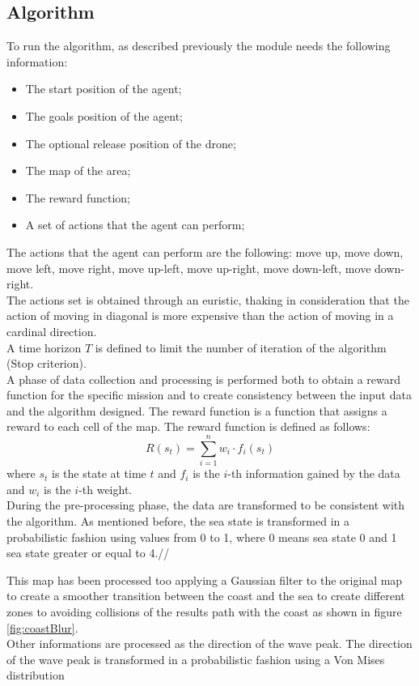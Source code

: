 \documentclass[journal,article,submit,pdftex,moreauthors]{Definitions/mdpi}
\begin{document}
\subsection{Algorithm}
To run the algorithm, as described previously the module needs the following information:
\begin{itemize}
	\item The start position of the agent;
	\item The goals position of the agent;
	\item The optional release position of the drone;
	\item The map of the area;
	\item The reward function;
	\item A set of actions that the agent can perform;
\end{itemize}

The actions that the agent can perform are the following: {move up, move down, move left, move right, move up-left, move up-right, move down-left, move down-right}.\\
The actions set is obtained through an euristic, thaking in consideration that the action of moving in diagonal is more expensive than the action of moving in a cardinal direction.\\
A time horizon $T$ is defined to limit the number of iteration of the algorithm (Stop criterion).\\

A phase of data collection and processing is performed both to obtain a reward function for the specific mission and to create consistency between the input data and the algorithm designed.
The reward function is a function that assigns a reward to each cell of the map. The reward function is defined as follows:
\begin{equation}
\label{eq:reward}
R(s_t) = \sum_{i=1}^n w_i \cdot f_i(s_t)
\end{equation}
where $s_t$ is the state at time $t$ and $f_i$ is the $i$-th information gained by the data and $w_i$ is the $i$-th weight.\\

During the pre-processing phase, the data are transformed to be consistent with the algorithm. As mentioned before, the sea state is transformed in a 
probabilistic fashion using values from 0 to 1, where 0 means sea state 0 and 1 sea state greater or equal to 4.//

This map has been processed too applying a Gaussian filter to the original map to create a smoother transition between the coast and the sea to create different zones to avoiding collisions of the results path with the coast as shown in figure \ref*{fig:coastBlur}.\\
Other informations are processed as the direction of the wave peak. The direction of the wave peak is transformed in a probabilistic fashion using a Von Mises distribution 
\end{document}
